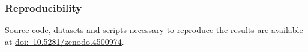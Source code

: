 \documentclass[sigconf,dvipsnames]{acmart}
\newcommand{\supplement}{\href{http://doi.org/10.5281/zenodo.4500974}{doi:~10.5281/zenodo.4500974}}
\begin{document}
\subsubsection{Reproducibility} Source code, datasets and scripts necessary to reproduce the results are available at \supplement.
%



\end{document}
